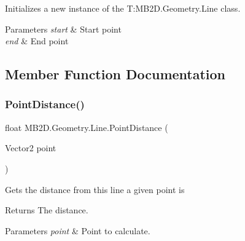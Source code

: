 Initializes a new instance of the T\+:\+M\+B2\+D.\+Geometry.\+Line class. 


\begin{DoxyParams}{Parameters}
{\em start} & Start point\\
\hline
{\em end} & End point\\
\hline
\end{DoxyParams}


\subsection{Member Function Documentation}
\hypertarget{class_m_b2_d_1_1_geometry_1_1_line_ae5d02b1abab30bf1c8f471df2061749f}{}\label{class_m_b2_d_1_1_geometry_1_1_line_ae5d02b1abab30bf1c8f471df2061749f} 
\subsubsection{\texorpdfstring{Point\+Distance()}{PointDistance()}\hspace{0.1cm}{\footnotesize\ttfamily [1/2]}}
{\footnotesize\ttfamily float M\+B2\+D.\+Geometry.\+Line.\+Point\+Distance (\begin{DoxyParamCaption}\item[{Vector2}]{point }\end{DoxyParamCaption})\hspace{0.3cm}{\ttfamily [inline]}}



Gets the distance from this line a given point is 

\begin{DoxyReturn}{Returns}
The distance.
\end{DoxyReturn}

\begin{DoxyParams}{Parameters}
{\em point} & Point to calculate.\\
\hline
\end{DoxyParams}
\hypertarget{class_m_b2_d_1_1_geometry_1_1_line_a5cbeb68ba1f9f2c8a191f4593a234fa8}{}\label{class_m_b2_d_1_1_geometry_1_1_line_a5cbeb68ba1f9f2c8a191f4593a234fa8} 
